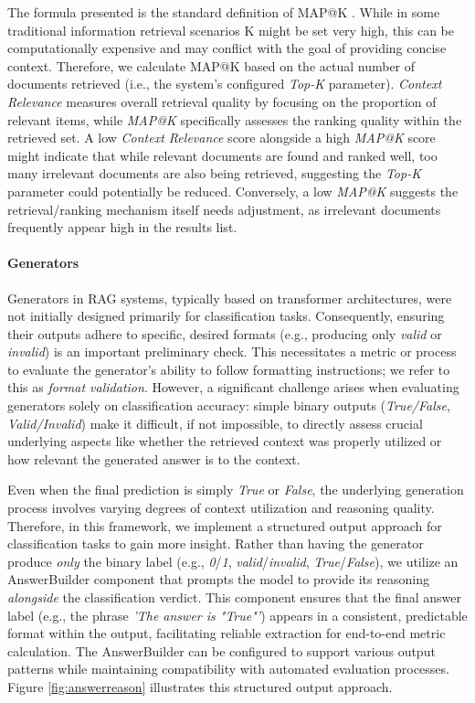 The formula presented is the standard definition of MAP@K \cite{Lin.13.10.2020}. While in some traditional information retrieval scenarios K might be set very high, this can be computationally expensive and may conflict with the goal of providing concise context. Therefore, we calculate MAP@K based on the actual number of documents retrieved (i.e., the system's configured \textit{Top-K} parameter). \textit{Context Relevance} measures overall retrieval quality by focusing on the proportion of relevant items, while \textit{MAP@K} specifically assesses the ranking quality within the retrieved set. A low \textit{Context Relevance} score alongside a high \textit{MAP@K} score might indicate that while relevant documents are found and ranked well, too many irrelevant documents are also being retrieved, suggesting the \textit{Top-K} parameter could potentially be reduced. Conversely, a low \textit{MAP@K} suggests the retrieval/ranking mechanism itself needs adjustment, as irrelevant documents frequently appear high in the results list.


\paragraph{Generators}
Generators in RAG systems, typically based on transformer architectures, were not initially designed primarily for classification tasks. Consequently, ensuring their outputs adhere to specific, desired formats (e.g., producing only \textit{valid} or \textit{invalid}) is an important preliminary check. This necessitates a metric or process to evaluate the generator's ability to follow formatting instructions; we refer to this as \textit{format validation}. However, a significant challenge arises when evaluating generators solely on classification accuracy: simple binary outputs (\textit{True/False}, \textit{Valid/Invalid}) make it difficult, if not impossible, to directly assess crucial underlying aspects like whether the retrieved context was properly utilized or how relevant the generated answer is to the context.

Even when the final prediction is simply \textit{True} or \textit{False}, the underlying generation process involves varying degrees of context utilization and reasoning quality. Therefore, in this framework, we implement a structured output approach for classification tasks to gain more insight. Rather than having the generator produce \textit{only} the binary label (e.g., \textit{0}/\textit{1}, \textit{valid}/\textit{invalid}, \textit{True}/\textit{False}), we utilize an AnswerBuilder component that prompts the model to provide its reasoning \textit{alongside} the classification verdict. This component ensures that the final answer label (e.g., the phrase \textit{'The answer is "True"'}) appears in a consistent, predictable format within the output, facilitating reliable extraction for end-to-end metric calculation. The AnswerBuilder can be configured to support various output patterns while maintaining compatibility with automated evaluation processes. Figure \ref{fig:answerreason} illustrates this structured output approach.


